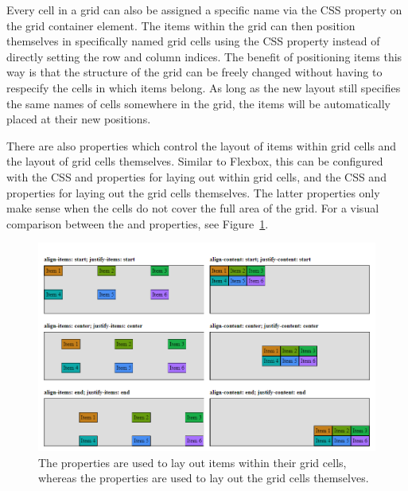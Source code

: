 Every cell in a grid can also be assigned a specific name via the CSS
 property on the grid container element.
The items within the grid can then position themselves in specifically
named grid cells using the CSS  property instead of
directly setting the row and column indices. The benefit of
positioning items this way is that the structure of the grid can be
freely changed without having to respecify the cells in which items
belong. As long as the new layout still specifies the same names of
cells somewhere in the grid, the items will be automatically placed at
their new positions.

There are also properties which control the layout of items within
grid cells and the layout of grid cells themselves. Similar to
Flexbox, this can be configured with the CSS  and
 properties for laying out within grid cells,
and the CSS  and 
properties for laying out the grid cells themselves. The latter
 properties only make sense when the cells do not
cover the full area of the grid. For a visual comparison between the
 and  properties, see
Figure~\ref{fig:GridLayoutProperties}.


\begin{figure}[tp]
\centering
\includegraphics[keepaspectratio,width=\linewidth,height=\halfh]
{images/grid-layout-properties.png}
\caption[Grid Layout Property Comparision]{
The  properties are used to lay out items within
their grid cells, whereas the  properties are
used to lay out the grid cells themselves. 
}
\label{fig:GridLayoutProperties}
\end{figure}


